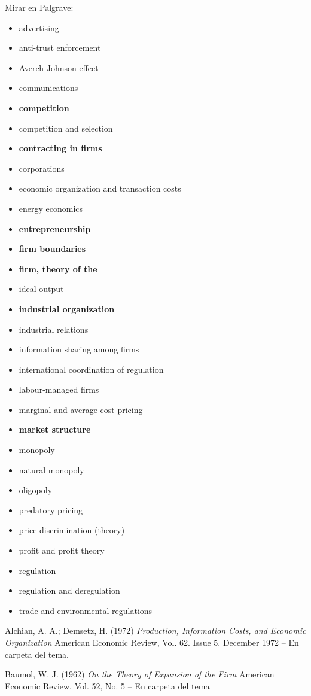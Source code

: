 \documentclass{nuevotema}
\begin{document}
\bibliografia

Mirar en Palgrave:
\begin{itemize}
	\item advertising
	\item anti-trust enforcement
	\item Averch-Johnson effect
	\item communications
	\item \textbf{competition}
	\item competition and selection
	\item \textbf{contracting in firms}
	\item corporations
	\item economic organization and transaction costs
	\item energy economics
	\item \textbf{entrepreneurship}
	\item \textbf{firm boundaries}
	\item \textbf{firm, theory of the}
	\item ideal output
	\item \textbf{industrial organization}
	\item industrial relations
	\item information sharing among firms
	\item international coordination of regulation
	\item labour-managed firms
	\item marginal and average cost pricing
	\item \textbf{market structure}
	\item monopoly
	\item natural monopoly
	\item oligopoly
	\item predatory pricing
	\item price discrimination (theory)
	\item profit and profit theory
	\item regulation
	\item regulation and deregulation
	\item trade and environmental regulations
\end{itemize}

Alchian, A. A.; Demsetz, H. (1972) \textit{Production, Information Costs, and Economic Organization} American Economic Review, Vol. 62. Issue 5. December 1972 -- En carpeta del tema.

Baumol, W. J. (1962) \textit{On the Theory of Expansion of the Firm} American Economic Review. Vol. 52, No. 5 -- En carpeta del tema
\end{document}
